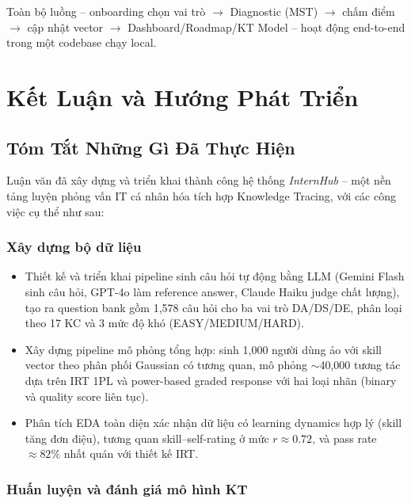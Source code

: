 \documentclass[12pt, a4paper]{report}
\newcommand{\system}{\textit{InternHub}}
\begin{document}


Toàn bộ luồng -- onboarding chọn vai trò $\to$ Diagnostic (MST) $\to$ chấm điểm $\to$ cập nhật vector $\to$ Dashboard/Roadmap/KT Model -- hoạt động end-to-end trong một codebase chạy local.

\chapter{Kết Luận và Hướng Phát Triển}
\label{chap:conclusion}

\section{Tóm Tắt Những Gì Đã Thực Hiện}
\label{sec:summary_done}

Luận văn đã xây dựng và triển khai thành công hệ thống \system{} -- một nền tảng luyện phỏng vấn IT cá nhân hóa tích hợp Knowledge Tracing, với các công việc cụ thể như sau:

\subsection{Xây dựng bộ dữ liệu}

\begin{itemize}
  \item Thiết kế và triển khai pipeline sinh câu hỏi tự động bằng LLM (Gemini Flash sinh câu hỏi, GPT-4o làm reference answer, Claude Haiku judge chất lượng), tạo ra question bank gồm 1{,}578 câu hỏi cho ba vai trò DA/DS/DE, phân loại theo 17 KC và 3 mức độ khó (EASY/MEDIUM/HARD).
  \item Xây dựng pipeline mô phỏng tổng hợp: sinh 1{,}000 người dùng ảo với skill vector theo phân phối Gaussian có tương quan, mô phỏng $\sim$40{,}000 tương tác dựa trên IRT 1PL và power-based graded response với hai loại nhãn (binary và quality score liên tục).
  \item Phân tích EDA toàn diện xác nhận dữ liệu có learning dynamics hợp lý (skill tăng đơn điệu), tương quan skill--self-rating ở mức $r \approx 0.72$, và pass rate $\approx 82\%$ nhất quán với thiết kế IRT.
\end{itemize}

\subsection{Huấn luyện và đánh giá mô hình KT}
\end{document}

